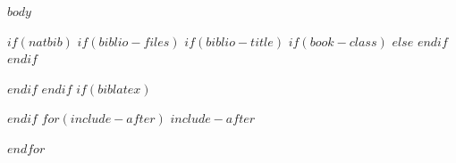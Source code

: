 \documentclass[a4paper, twocolumn, 10pt, twoside]{report}
\begin{document}
\pagestyle{fancy}
\fancyhf{}
\fancyhead[LO, RE]{\rightmark}
\fancyfoot[LO, RE]{\thepage}
\renewcommand{\headrulewidth}{0.1pt}

$body$

$if(natbib)$
$if(biblio-files)$
$if(biblio-title)$
$if(book-class)$
\renewcommand\bibname{$biblio-title$}
$else$
\renewcommand\refname{$biblio-title$}
$endif$
$endif$


$endif$
$endif$
$if(biblatex)$

$endif$
$for(include-after)$
$include-after$

$endfor$
\end{document}
